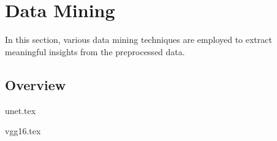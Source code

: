 \section{Data Mining}\label{data_mining}

In this section, various data mining techniques are employed to extract meaningful insights from the preprocessed data.



\subsection{Overview}\label{overview}



{unet.tex}

{vgg16.tex}
